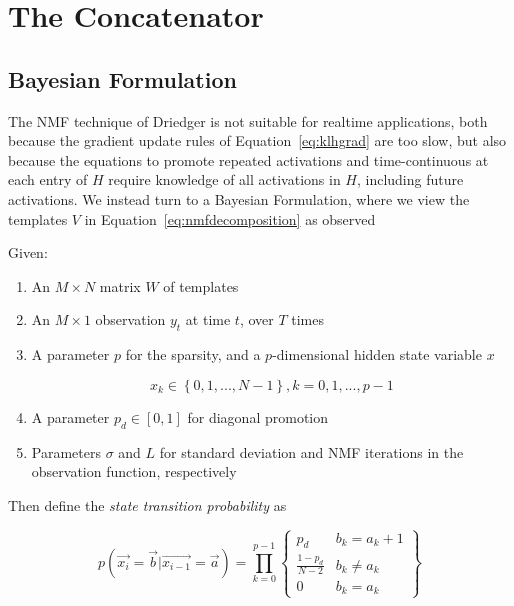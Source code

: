 \documentclass{article}
\begin{document}
\section{The Concatenator}

\subsection{Bayesian Formulation}
\label{sec:bayesian}

    The NMF technique of Driedger is not suitable for realtime applications, both because the gradient update rules of Equation~\ref{eq:klhgrad} are too slow, but also because the equations to promote repeated activations and time-continuous at each entry of $H$ require knowledge of all activations in $H$, including future activations.  We instead turn to a Bayesian Formulation, where we view the templates $V$ in Equation~\ref{eq:nmfdecomposition} as observed 

    Given:
    \begin{enumerate}
        \item
            An $M \times N$ matrix $W$ of templates
        
        \item
            An $M \times 1$ observation $y_t$ at time $t$, over $T$ times
        
        \item
            A parameter $p$ for the sparsity, and a $p$-dimensional hidden state variable $x$

                \[ x_k \in \left\{0, 1, ..., N-1\right\}, k = 0, 1, ..., p-1 \]
        
        \item
            A parameter $p_d \in [0, 1]$ for diagonal promotion
        
        \item
            Parameters $\sigma$ and $L$ for standard deviation and NMF iterations in the observation function, respectively
        
    \end{enumerate}

        Then define the {\em state transition probability} as 

		\begin{equation}
        	p(\vec{x_i} = \vec{b} | \vec{x_{i-1}} = \vec{a}) = \prod_{k=0}^{p-1} \left\{  \begin{array}{cc}  p_d & b_k = a_k+1  \\ \frac{1-p_d}{N-2} & b_k \neq a_k \\ 0 & b_k = a_k \end{array} \right\}
		\end{equation}
\end{document}

